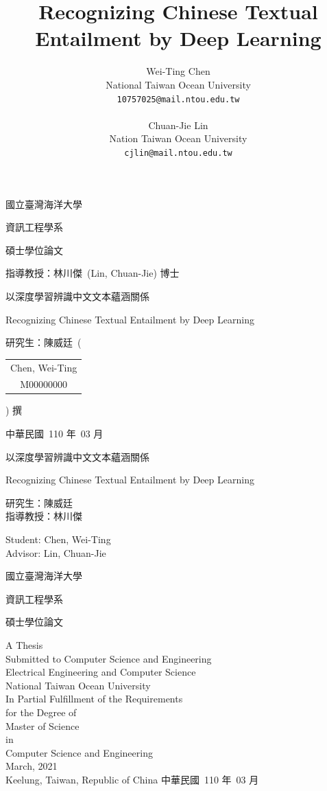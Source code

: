 \documentclass[12pt]{article}
\title{Recognizing Chinese Textual Entailment by Deep Learning}
\author{
  Wei-Ting Chen\\
  National Taiwan Ocean University\\
  \texttt{10757025@mail.ntou.edu.tw}\\
  \\
  Chuan-Jie Lin\\
  Nation Taiwan Ocean University\\
  \texttt{cjlin@mail.ntou.edu.tw}\\
}
\begin{document}
  \begin{CJK*}{UTF8}{bkai}

  \begin{titlepage}
  \centering
  {\Huge 國立臺灣海洋大學\par}
  \vspace{1cm}
  {\huge 資訊工程學系\par}
  \vspace{1cm}
  {\huge 碩士學位論文\par}
  \vspace{2cm}
  {\LARGE 指導教授：林川傑\ (Lin, Chuan-Jie) 博士\par}
  \vfill
  {\LARGE 以深度學習辨識中文文本蘊涵關係\par}
  {\LARGE Recognizing Chinese Textual Entailment by Deep Learning\par}
  \vfill
  {\LARGE 研究生：陳威廷\ \bigg(
    \begin{tabular}{c}
      Chen, Wei-Ting \\
      M00000000
    \end{tabular}
    \bigg) 撰}
    \vfill
    {\LARGE 中華民國\ 110 年\ 03 月}
  \end{titlepage}

  \newpage

  \begin{titlepage}
    \centering
  {\LARGE 以深度學習辨識中文文本蘊涵關係\par}
  \vfill
  {\Large Recognizing Chinese Textual Entailment by Deep Learning\par}
  \vfill
  {
    \Large
    \begin{minipage}{2in}
      研究生：陳威廷 \\
      指導教授：林川傑
    \end{minipage}
    \hfill
    \begin{minipage}{2.4in}
      Student: Chen, Wei-Ting \\
      Advisor: Lin, Chuan-Jie
    \end{minipage}
    \par
    }
    \vfill
    {\LARGE 國立臺灣海洋大學\par}
    {\LARGE 資訊工程學系\par}
    {\LARGE 碩士學位論文\par}
    \vfill
    {
      \LARGE
      A Thesis \\
      Submitted to Computer Science and Engineering \\
      Electrical Engineering and Computer Science \\
      National Taiwan Ocean University \\
      In Partial Fulfillment of the Requirements \\
      for the Degree of \\
      Master of Science \\
      in \\
      Computer Science and Engineering \\
      March, 2021 \\ \vspace{0.5cm}
      Keelung, Taiwan, Republic of China
      }
      \vfill
      {\LARGE 中華民國\ 110 年\ 03 月}
\end{titlepage}


\end{CJK*}
\end{document}
